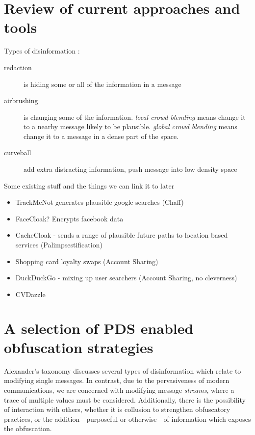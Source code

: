 \documentclass{IOS-Book-Article}     %
\begin{document}
\section{Review of current approaches and tools} 

Types of disinformation \cite{alexander2010Disinformation}:
\begin{description}
  \item[redaction] is hiding some or all of the information in a message
  \item[airbrushing] is changing some of the information. \emph{local crowd
  blending} means change it to a nearby message likely to be plausible.
  \emph{global crowd blending} means change it to a message in a dense part of
  the space.
  \item[curveball] add extra distracting information, push message into low
  density space
\end{description}


Some existing stuff and the things we can link it to later

\begin{itemize}
  \item TrackMeNot generates plausible google searches (Chaff)
  \item FaceCloak? Encrypts facebook data
  \item CacheCloak - sends a range of plausible future paths to location based
  services (Palimpsestification)
  \item Shopping card loyalty swaps (Account Sharing)
  \item DuckDuckGo - mixing up user searchers (Account Sharing, no cleverness)
  \item CVDazzle
\end{itemize}





\section{A selection of PDS enabled obfuscation strategies}

Alexander's taxonomy \cite{alexander2010Disinformation} discusses several types
of disinformation which relate to modifying single messages. In contrast, due to
the pervasiveness of modern communications, we are concerned with modifying
message \emph{streams}, where a trace of multiple values must be considered.
Additionally, there is the possibility of interaction with others, whether it is
collusion to strengthen obfuscatory practices, or the addition---purposeful or
otherwise---of information which exposes the obfuscation.
\end{document}
